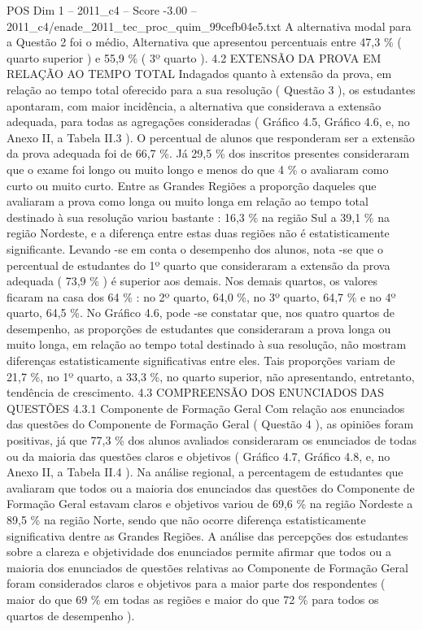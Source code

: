 \begin{textsample}{POS Dim 1 – 2011\_c4 – Score -3.00 – 2011\_c4/enade\_2011\_tec\_proc\_quim\_99cefb04e5.txt}
A alternativa modal para a Questão 2 foi o médio, Alternativa que apresentou percentuais entre 47,3 \% ( quarto superior ) e 55,9 \% ( 3º quarto ). 4.2 EXTENSÃO DA PROVA EM RELAÇÃO AO TEMPO TOTAL Indagados quanto à extensão da prova, em relação ao tempo total oferecido para a sua resolução ( Questão 3 ), os estudantes apontaram, com maior incidência, a alternativa que considerava a extensão adequada, para todas as agregações consideradas ( Gráfico 4.5, Gráfico 4.6, e, no Anexo II, a Tabela II.3 ).
O percentual de alunos que responderam ser a extensão da prova adequada foi de 66,7 \%.
Já 29,5 \% dos inscritos presentes consideraram que o exame foi longo ou muito longo e menos do que 4 \% o avaliaram como curto ou muito curto.
Entre as Grandes Regiões a proporção daqueles que avaliaram a prova como longa ou muito longa em relação ao tempo total destinado à sua resolução variou bastante : 16,3 \% na região Sul a 39,1 \% na região Nordeste, e a diferença entre estas duas regiões não é estatisticamente significante.
Levando -se em conta o desempenho dos alunos, nota -se que o percentual de estudantes do 1º quarto que consideraram a extensão da prova adequada ( 73,9 \% ) é superior aos demais.
Nos demais quartos, os valores ficaram na casa dos 64 \% : no 2º quarto, 64,0 \%, no 3º quarto, 64,7 \% e no 4º quarto, 64,5 \%.
No Gráfico 4.6, pode -se constatar que, nos quatro quartos de desempenho, as proporções de estudantes que consideraram a prova longa ou muito longa, em relação ao tempo total destinado à sua resolução, não mostram diferenças estatisticamente significativas entre eles.
Tais proporções variam de 21,7 \%, no 1º quarto, a 33,3 \%, no quarto superior, não apresentando, entretanto, tendência de crescimento. 4.3 COMPREENSÃO DOS ENUNCIADOS DAS QUESTÕES 4.3.1 Componente de Formação Geral Com relação aos enunciados das questões do Componente de Formação Geral ( Questão 4 ), as opiniões foram positivas, já que 77,3 \% dos alunos avaliados consideraram os enunciados de todas ou da maioria das questões claros e objetivos ( Gráfico 4.7, Gráfico 4.8, e, no Anexo II, a Tabela II.4 ).
Na análise regional, a percentagem de estudantes que avaliaram que todos ou a maioria dos enunciados das questões do Componente de Formação Geral estavam claros e objetivos variou de 69,6 \% na região Nordeste a 89,5 \% na região Norte, sendo que não ocorre diferença estatisticamente significativa dentre as Grandes Regiões.
A análise das percepções dos estudantes sobre a clareza e objetividade dos enunciados permite afirmar que todos ou a maioria dos enunciados de questões relativas ao Componente de Formação Geral foram considerados claros e objetivos para a maior parte dos respondentes ( maior do que 69 \% em todas as regiões e maior do que 72 \% para todos os quartos de desempenho ).

\end{textsample}
